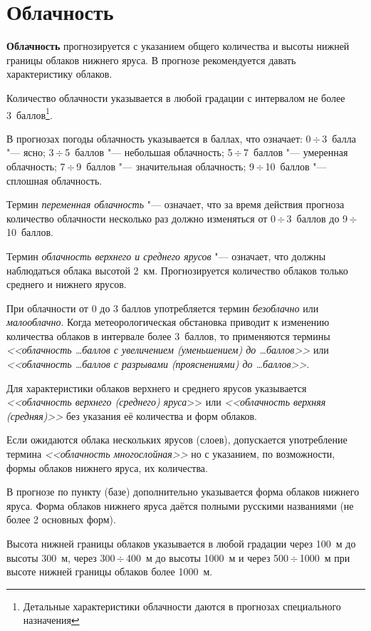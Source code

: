 \documentclass[a4paper, 12pt, twoside, draft, book, russian, fittopage, cyremdash, openright]{ncc}
\newcommand{\otdo}{\,\ensuremath{\div}\,}
\begin{document}
\section{Облачность}
\label{sec:clouds_p}

\textbf{Облачность} прогнозируется с указанием общего количества и
высоты нижней границы облаков нижнего яруса. В прогнозе рекомендуется
давать характеристику облаков.

Количество облачности указывается в любой градации с интервалом не
более 3~баллов\footnote{Детальные характеристики облачности даются в
  прогнозах специального назначения}.

В прогнозах погоды облачность указывается в баллах, что означает:
0\otdo3~балла "--- ясно; 3\otdo5~баллов "--- небольшая облачность;
5\otdo7~баллов "--- умеренная облачность; 7\otdo9~баллов "---
значительная облачность; 9\otdo10~баллов "--- сплошная облачность.

Термин \textit{переменная облачность} "--- означает, что за время
действия прогноза количество облачности несколько раз должно
изменяться от 0\otdo3~баллов до 9\otdo10~баллов.

Термин \textit{облачность верхнего и среднего ярусов} "--- означает,
что должны наблюдаться облака высотой 2~км. Прогнозируется количество
облаков только среднего и нижнего ярусов.

При облачности от 0 до 3 баллов употребляется термин
\textit{безоблачно} или \textit{малооблачно}. Когда метеорологическая
обстановка приводит к изменению количества облаков в интервале более
3~баллов, то применяются термины \textit{<<облачность \ldots баллов с увеличением
(уменьшением) до \ldots баллов>>} или \textit{<<облачность \ldots баллов с разрывами
(прояснениями) до \ldots баллов>>}.

Для характеристики облаков верхнего и среднего ярусов указывается
\textit{<<облачность верхнего (среднего) яруса}>> или
\textit{<<облачность верхняя (средняя)>>} без указания её количества и
форм облаков.

Если ожидаются облака нескольких ярусов (слоев), допускается
употребление термина \textit{<<облачность многослойная>>} но с
указанием, по возможности, формы облаков нижнего яруса, их количества.

В прогнозе по пункту (базе) дополнительно указывается форма облаков
нижнего яруса. Форма облаков нижнего яруса даётся полными русскими
названиями (не более 2 основных форм).

Высота нижней границы облаков указывается в любой градации через 100~м
до высоты 300~м, через 300\otdo400~м до высоты 1000~м и через 500\otdo1000~м
при высоте нижней границы облаков более 1000~м.
\end{document}
